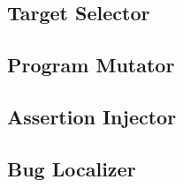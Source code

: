 \subsection{Target Selector}



\subsection{Program Mutator}



\subsection{Assertion Injector}



\subsection{Bug Localizer}

